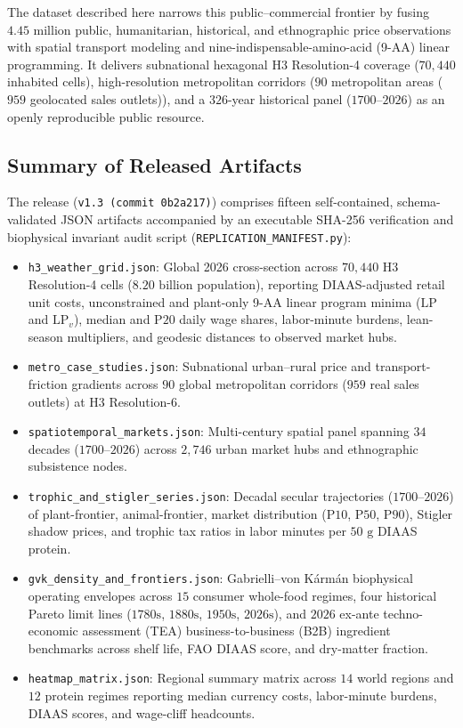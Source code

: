 \documentclass[11pt,a4paper]{article}
\begin{document}
The dataset described here narrows this public--commercial frontier by fusing $4.45\text{ million}$ public, humanitarian, historical, and ethnographic price observations with spatial transport modeling and nine-indispensable-amino-acid (9-AA) linear programming. It delivers subnational hexagonal H3 Resolution-4 coverage ($70{,}440$ inhabited cells), high-resolution metropolitan corridors ($90$ metropolitan areas ($959$ geolocated sales outlets)), and a $326$-year historical panel ($1700\text{--}2026$) as an openly reproducible public resource.

\subsection{Summary of Released Artifacts}
The release (\texttt{v1.3 (commit 0b2a217)}) comprises fifteen self-contained, schema-validated JSON artifacts accompanied by an executable SHA-256 verification and biophysical invariant audit script (\texttt{REPLICATION\_MANIFEST.py}):
\begin{itemize}
    \item \texttt{h3\_weather\_grid.json}: Global 2026 cross-section across $70{,}440$ H3 Resolution-4 cells ($8.20\text{ billion}$ population), reporting DIAAS-adjusted retail unit costs, unconstrained and plant-only 9-AA linear program minima ($\text{LP}$ and $\text{LP}_v$), median and $\text{P20}$ daily wage shares, labor-minute burdens, lean-season multipliers, and geodesic distances to observed market hubs.
    \item \texttt{metro\_case\_studies.json}: Subnational urban--rural price and transport-friction gradients across $90$ global metropolitan corridors ($959$ real sales outlets) at H3 Resolution-6.
    \item \texttt{spatiotemporal\_markets.json}: Multi-century spatial panel spanning $34$ decades ($1700\text{--}2026$) across $2{,}746$ urban market hubs and ethnographic subsistence nodes.
    \item \texttt{trophic\_and\_stigler\_series.json}: Decadal secular trajectories ($1700\text{--}2026$) of plant-frontier, animal-frontier, market distribution ($\text{P10}$, $\text{P50}$, $\text{P90}$), Stigler shadow prices, and trophic tax ratios in labor minutes per $50\text{ g}$ DIAAS protein.
    \item \texttt{gvk\_density\_and\_frontiers.json}: Gabrielli--von K\'arm\'an biophysical operating envelopes across $15$ consumer whole-food regimes, four historical Pareto limit lines ($1780\text{s}$, $1880\text{s}$, $1950\text{s}$, $2026\text{s}$), and $2026$ ex-ante techno-economic assessment (TEA) business-to-business (B2B) ingredient benchmarks across shelf life, FAO DIAAS score, and dry-matter fraction.
    \item \texttt{heatmap\_matrix.json}: Regional summary matrix across $14$ world regions and $12$ protein regimes reporting median currency costs, labor-minute burdens, DIAAS scores, and wage-cliff headcounts.
\end{itemize}
\end{document}
